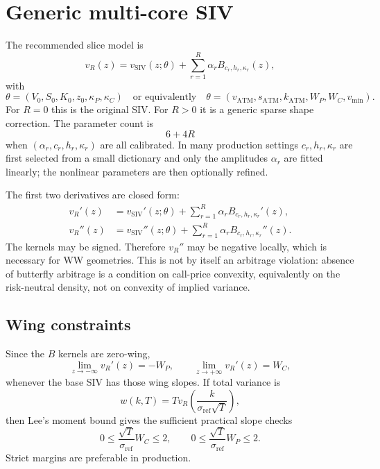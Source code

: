 \documentclass[11pt]{article}
\newcommand{\sigref}{\sigma_{\mathrm{ref}}}
\begin{document}
\section{Generic multi-core SIV}
\label{sec:mcsiv}

The recommended slice model is
\begin{equation}
  v_R(z)
  =v_{\mathrm{SIV}}(z;\theta)
  +\sum_{r=1}^{R}\alpha_r B_{c_r,h_r,\kappa_r}(z),
  \label{eq:mcsiv-slice}
\end{equation}
with
\begin{equation}
  \theta=(V_0,S_0,K_0,z_0,\kappa_P,\kappa_C)
  \quad\text{or equivalently}\quad
  \theta=(v_{\mathrm{ATM}},s_{\mathrm{ATM}},k_{\mathrm{ATM}},W_P,W_C,v_{\min}).
\end{equation}
For $R=0$ this is the original SIV.  For $R>0$ it is a generic sparse shape correction.  The parameter count is
\begin{equation}
  6+4R
  \label{eq:param-count}
\end{equation}
when $(\alpha_r,c_r,h_r,\kappa_r)$ are all calibrated.  In many production settings $c_r,h_r,\kappa_r$ are first selected from a small dictionary and only the amplitudes $\alpha_r$ are fitted linearly; the nonlinear parameters are then optionally refined.

The first two derivatives are closed form:
\begin{align}
  v_R'(z)
  &=v_{\mathrm{SIV}}'(z;\theta)
    +\sum_{r=1}^{R}\alpha_r B_{c_r,h_r,\kappa_r}'(z),
  \label{eq:mcsiv-prime}\\
  v_R''(z)
  &=v_{\mathrm{SIV}}''(z;\theta)
    +\sum_{r=1}^{R}\alpha_r B_{c_r,h_r,\kappa_r}''(z).
  \label{eq:mcsiv-second}
\end{align}
The kernels may be signed.  Therefore $v_R''$ may be negative locally, which is necessary for WW geometries.  This is not by itself an arbitrage violation: absence of butterfly arbitrage is a condition on call-price convexity, equivalently on the risk-neutral density, not on convexity of implied variance.

\subsection{Wing constraints}

Since the $B$ kernels are zero-wing,
\begin{equation}
  \lim_{z\to-\infty}v_R'(z)=-W_P,
  \qquad
  \lim_{z\to+\infty}v_R'(z)=W_C,
  \label{eq:mcsiv-wing-slopes}
\end{equation}
whenever the base SIV has those wing slopes.  If total variance is
\begin{equation}
  w(k,T)=T v_R\!\left(\frac{k}{\sigref\sqrt{T}}\right),
\end{equation}
then Lee's moment bound gives the sufficient practical slope checks
\begin{equation}
  0\le \frac{\sqrt{T}}{\sigref}W_C\le 2,
  \qquad
  0\le \frac{\sqrt{T}}{\sigref}W_P\le 2.
  \label{eq:lee-checks}
\end{equation}
Strict margins are preferable in production.
\end{document}
